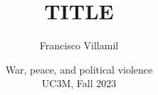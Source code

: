 \documentclass[aspectratio=43]{beamer}
\title{\huge TITLE}
\author{Francisco Villamil}
\date{War, peace, and political violence\\UC3M, Fall 2023}
\begin{document}
\begin{frame}
  \titlepage
\end{frame}
\end{document}
